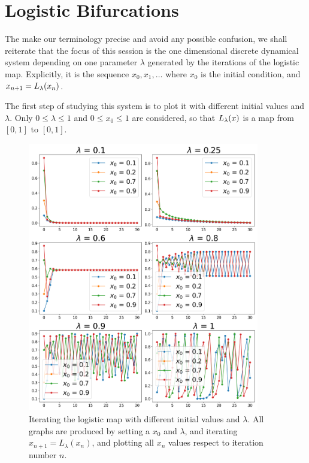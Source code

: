 \section{Logistic Bifurcations}

The make our terminology precise and avoid any possible confusion, we shall reiterate that the focus of this session is the one dimensional discrete dynamical system depending on one parameter $\lambda$ generated by the iterations of the logistic map. 
Explicitly, it is the sequence $x_0, x_1, \dots $ where $x_0$ is the initial condition, and $x_{n+1} = L_{\lambda}(x_n)$.

The first step of studying this system is to plot it with different initial values and $\lambda$. Only $0 \leq \lambda \leq 1$ and $0 \leq x_0 \leq 1$ are considered, so that $L_{\lambda}(x)$ is a map from $[0,1]$ to $[0,1]$. 

\begin{figure}[htbp]
	\centering
	\includegraphics[width=0.9\textwidth]{./figures/various_iterating_logistic_map.png}
	\caption{Iterating the logistic map with different initial values and $\lambda$. All graphs are produced by setting a $x_0$ and $\lambda$, and iterating $x_{n+1} = L_{\lambda}(x_n)$, and plotting all $x_n$ values respect to iteration number $n$.}
	\label{fig:various_iter_logistic}
\end{figure}

